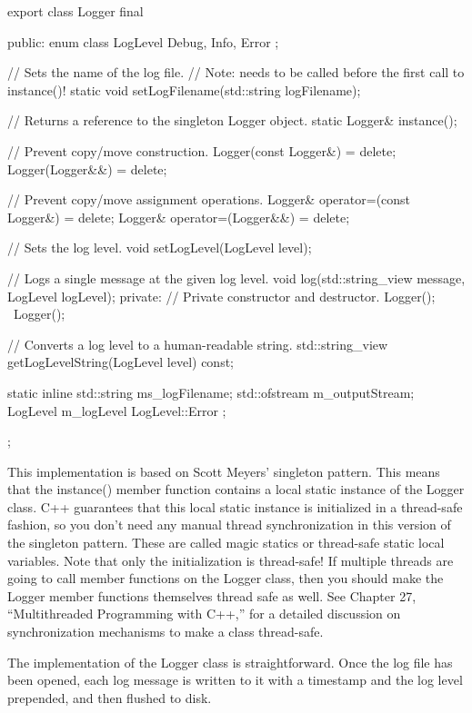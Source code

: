 \begin{cpp}
export class Logger final
{
    public:
        enum class LogLevel { Debug, Info, Error };

        // Sets the name of the log file.
        // Note: needs to be called before the first call to instance()!
        static void setLogFilename(std::string logFilename);

        // Returns a reference to the singleton Logger object.
        static Logger& instance();

        // Prevent copy/move construction.
        Logger(const Logger&) = delete;
        Logger(Logger&&) = delete;

        // Prevent copy/move assignment operations.
        Logger& operator=(const Logger&) = delete;
        Logger& operator=(Logger&&) = delete;

        // Sets the log level.
        void setLogLevel(LogLevel level);

        // Logs a single message at the given log level.
        void log(std::string_view message, LogLevel logLevel);
    private:
        // Private constructor and destructor.
        Logger();
        ~Logger();

        // Converts a log level to a human-readable string.
        std::string_view getLogLevelString(LogLevel level) const;

        static inline std::string ms_logFilename;
        std::ofstream m_outputStream;
        LogLevel m_logLevel { LogLevel::Error };
};
\end{cpp}

This implementation is based on Scott Meyers’ singleton pattern. This means that the instance() member function contains a local static instance of the Logger class. C++ guarantees that this local static instance is initialized in a thread-safe fashion, so you don’t need any manual thread synchronization in this version of the singleton pattern. These are called magic statics or thread-safe static local variables. Note that only the initialization is thread-safe! If multiple threads are going to call member functions on the Logger class, then you should make the Logger member functions themselves thread safe as well. See Chapter 27, “Multithreaded Programming with C++,” for a detailed discussion on synchronization mechanisms to make a class thread-safe.

The implementation of the Logger class is straightforward. Once the log file has been opened, each log message is written to it with a timestamp and the log level prepended, and then flushed to disk.


